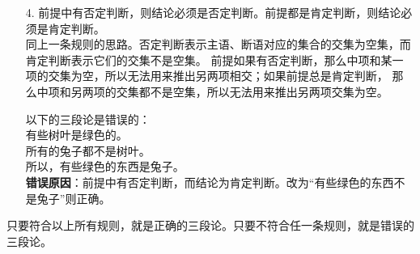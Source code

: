 \documentclass[12pt,UTF8]{ctexbook}
\begin{document}
\begin{enumerate}
    \item[4.] 前提中有否定判断，则结论必须是否定判断。前提都是肯定判断，则结论必须是肯定判断。\\
    同上一条规则的思路。否定判断表示主语、断语对应的集合的交集为空集，而肯定判断表示它们的交集不是空集。
    前提如果有否定判断，那么中项和某一项的交集为空，所以无法用来推出另两项相交；如果前提总是肯定判断，
    那么中项和另两项的交集都不是空集，所以无法用来推出另两项交集为空。
    \begin{ex*}
        以下的三段论是错误的： \\
        \indent 有些树叶是绿色的。\\
        \indent 所有的兔子都不是树叶。\\
        \indent 所以，有些绿色的东西是兔子。\\
        \textbf{错误原因}：前提中有否定判断，而结论为肯定判断。改为“有些绿色的东西不是兔子”则正确。
    \end{ex*}
\end{enumerate}
只要符合以上所有规则，就是正确的三段论。只要不符合任一条规则，就是错误的三段论。
\end{document}
